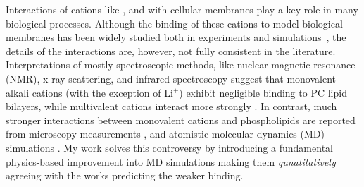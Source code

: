 \documentclass[12pt,a4paper,twoside,openright]{report}
\begin{document}
Interactions of cations like ,  and  with cellular membranes 
play a key role in many biological processes. 
Although the binding of these cations to model biological membranes 
has been widely studied both in
experiments and simulations~\citep{catte16, nmrlipids_proj4},
the details of the interactions are, however, not fully consistent in the literature.
Interpretations of mostly spectroscopic methods, like nuclear magnetic resonance (NMR), 
x-ray scattering, and infrared spectroscopy suggest that monovalent alkali cations (with the exception of Li$^+$) 
exhibit negligible binding to PC lipid bilayers, 
while multivalent cations interact more strongly 
\citep{cevc90,tocanne90, hauser76,hauser78,herbette84,altenbach84,uhrikova08}.
In contrast, much stronger interactions between monovalent cations and phospholipids are reported from 
microscopy measurements \citep{harb13,manyes06,fukuma07,ferber11,morata12},
and atomistic molecular dynamics (MD) simulations \citep{cordomi09,valley11,berkowitz12,catte16,nmrlipids_proj4,melcr18}.
My work solves this controversy
by introducing a fundamental physics-based improvement into MD simulations
making them \emph{qunatitatively} agreeing with the works predicting the weaker binding. 
\end{document}
